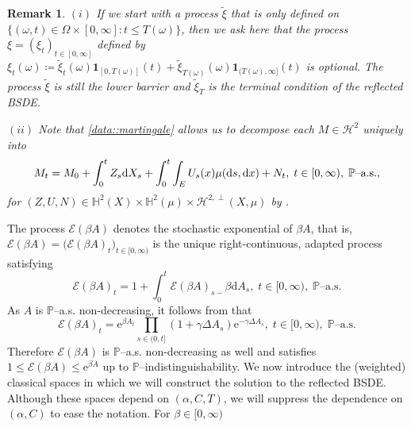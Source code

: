 \documentclass[10pt]{article} %
\newtheorem{remark}[theorem]{Remark}
\newcommand\cE{\mathcal E}
\newcommand\cH{\mathcal H}
\def \H{\mathbb{H}}
\def \P{\mathbb{P}}
\newcommand{\1}{\mathbf{1}}
\def\d{\mathrm{d}}
\begin{document}
\begin{remark}\label{rem::after_data}
$(i)$ If we start with a process $\tilde\xi$ that is only defined on $\{(\omega,t) \in \Omega \times [0,\infty] : t \leq T(\omega)\}$, then we ask here that the process $\xi = (\xi_t)_{t \in [0,\infty]}$ defined by $\xi_t(\omega) \coloneqq \tilde\xi_t(\omega) \mathbf{1}_{[0,T(\omega)]}(t) + \tilde\xi_{T(\omega)}(\omega) \mathbf{1}_{(T(\omega),\infty]}(t)$ is optional. The process $\tilde\xi$ is still the lower barrier and $\tilde\xi_T$ is the terminal condition of the reflected {\rm BSDE}.

\medskip
$(ii)$ Note that \ref{data::martingale} allows us to decompose each $M \in \cH^2$ uniquely into
\begin{equation*}
	M_t = M_0 + \int_0^t Z_s \d X_s + \int_0^t \int_E U_s(x) \mu(\d s, \d x) + N_t, \; t \in [0,\infty), \; \text{$\P$\rm--a.s.},
\end{equation*}
for $(Z,U,N) \in \H^2(X) \times \H^2(\mu) \times \cH^{2,\perp}(X,\mu)$ by {\rm{}}.
\end{remark}

The process $\cE(\beta A)$ denotes the stochastic exponential of $\beta A$, that is, $\cE(\beta A) = \big(\cE(\beta A)_t\big)_{t \in [0,\infty)}$ is the unique right-continuous, adapted process satisfying
\begin{equation*}
	\cE(\beta A)_t = 1 + \int_0^t \cE(\beta A)_{s-}\beta \d A_s, \; t \in [0,\infty), \; \text{$\P$--a.s.}
\end{equation*}
As $A$ is $\P$--a.s. non-decreasing, it follows from \cite[Theorem I.4.61]{jacod2003limit} that
\begin{equation*}
	\displaystyle \cE(\beta A)_t = \mathrm{e}^{\beta A_t} \prod_{s \in (0,t]}(1+\gamma\Delta A_s)\mathrm{e}^{-\gamma\Delta A_s}, \; t \in [0,\infty), \; \text{$\P$--a.s.}
\end{equation*}
Therefore $\cE(\beta A)$ is $\P$--a.s. non-decreasing as well and satisfies $1\leq\cE(\beta A)\leq\mathrm{e}^{\beta A}$ up to $\P$--indistinguishability.
We now introduce the (weighted) classical spaces in which we will construct the solution to the reflected BSDE. Although these spaces depend on $(\alpha,C,T)$, we will suppress the dependence on $(\alpha,C)$ to ease the notation. For $\beta \in [0,\infty)$
\end{document}
